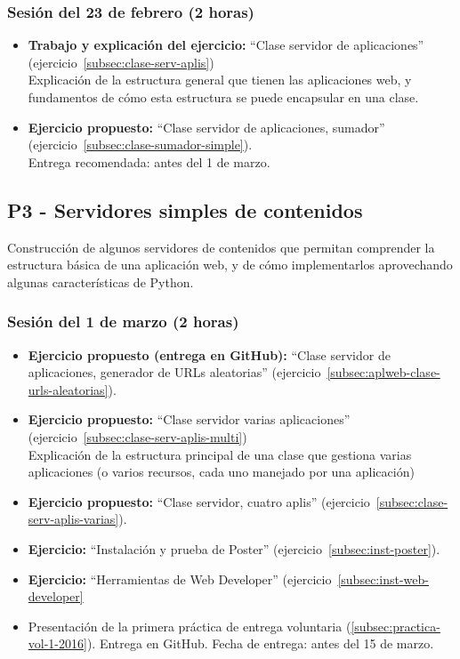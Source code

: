 \documentclass[a4paper,12pt]{article}
\begin{document}
\subsubsection{Sesión del 23 de febrero (2 horas)}

\begin{itemize}
\item \textbf{Trabajo y explicación del ejercicio:} ``Clase servidor de aplicaciones'' (ejercicio~\ref{subsec:clase-serv-aplis}) \\
  Explicación de la estructura general que tienen las aplicaciones web, y fundamentos de cómo esta estructura se puede encapsular en una clase.
\item \textbf{Ejercicio propuesto:} ``Clase servidor de aplicaciones, sumador'' (ejercicio~\ref{subsec:clase-sumador-simple}). \\
  Entrega recomendada: antes del 1 de marzo.
\end{itemize}


\subsection{P3 - Servidores simples de contenidos}

Construcción de algunos servidores de contenidos que permitan comprender la estructura básica de una aplicación web, y de cómo implementarlos aprovechando algunas características de Python.

\subsubsection{Sesión del 1 de marzo (2 horas)}

\begin{itemize}

\item \textbf{Ejercicio propuesto (entrega en GitHub):} ``Clase servidor de aplicaciones, generador de URLs aleatorias'' (ejercicio~\ref{subsec:aplweb-clase-urls-aleatorias}).
\item \textbf{Ejercicio propuesto:}  ``Clase servidor varias aplicaciones'' (ejercicio~\ref{subsec:clase-serv-aplis-multi}) \\
  Explicación de la estructura principal de una clase que gestiona varias aplicaciones (o varios recursos, cada uno manejado por una aplicación)
\item \textbf{Ejercicio propuesto:} ``Clase servidor, cuatro aplis'' (ejercicio~\ref{subsec:clase-serv-aplis-varias}).
 \item \textbf{Ejercicio:} ``Instalación y prueba de Poster'' (ejercicio~\ref{subsec:inst-poster}).
  \item \textbf{Ejercicio:} ``Herramientas de Web Developer'' (ejercicio~\ref{subsec:inst-web-developer}
  \item Presentación de la primera práctica de entrega voluntaria (\ref{subsec:practica-vol-1-2016}). Entrega en GitHub. Fecha de entrega: antes del 15 de marzo.
\end{itemize}
\end{document}
